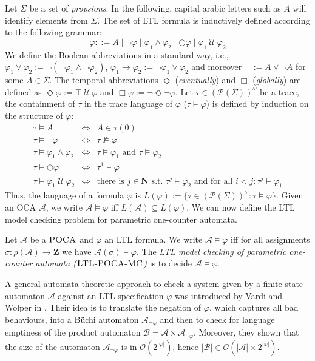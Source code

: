 \documentclass{llncs}
\newcommand{\naturals}{\ensuremath{\mathbf{N}}}
\newcommand{\integers}{\ensuremath{\mathbf{Z}}}
\newcommand{\automaton}{\ensuremath{\mathcal{A}}}
\newcommand{\trace}{\ensuremath{\tau}}
\newcommand{\oca}{\textsc{OCA} }
\newcommand{\poca}{\textsc{POCA} }
\newcommand{\ltlpoca}{\textsc{LTL-POCA-MC} }
\newcommand{\ltl}{\textsc{LTL} }
\newcommand{\until}{\ensuremath{\mathcal{~U~}}}
\newcommand{\propalphabet}{\ensuremath{\Sigma}}
\newcommand{\pastarred}{\ensuremath{(\mathcal{P}(\propalphabet))^{\omega}}}
\newcommand{\defemph}[1]{\emph{#1}}
\begin{document}
Let $\propalphabet$ be a set of \defemph{propsions}. In the following,
capital arabic letters such as $A$ will identify elements from
$\propalphabet$.  The set of \ltl formula is inductively defined
according to the following grammar:
\begin{equation*}
  \varphi ::= A \mid \neg \varphi \mid \varphi_1 \wedge \varphi_2 \mid
  \bigcirc \varphi \mid \varphi_1 \until \varphi_2
\end{equation*}
We define the Boolean abbreviations in a standard way, i.e.,
$\varphi_1 \vee \varphi_2 := \neg (\neg \varphi_1 \wedge \neg
\varphi_2)$, $\varphi_1\rightarrow \varphi_2:=\neg \varphi_1 \vee
\varphi_2$ and moreover $\top:=A\vee \neg A$ for some $A\in
\propalphabet$. The temporal abbreviations $\Diamond$
(\defemph{eventually}) and $\Box$ (\defemph{globally}) are defined as
$\Diamond \varphi:= \top \until \varphi$ and $\Box \varphi := \neg
\Diamond \neg \varphi$.  Let $\trace \in \pastarred$ be a trace, the
containment of $\trace$ in the trace language of $\varphi$ ($\trace
\models \varphi$) is defined by induction on the structure of
$\varphi$:
\begin{eqnarray*}
  \trace \models  A &  \iff & A\in\trace(0)\\
  \trace \models  \neg \varphi &\iff & \trace \not \models \varphi\\
  \trace \models \varphi_1 \wedge \varphi_2 &\iff& \trace
  \models \varphi_1 \text{ and } \trace \models \varphi_2\\
  \trace \models \bigcirc \varphi & \iff & \tau^1 \models \varphi\\
  \trace \models  \varphi_1 \until \varphi_2 & \iff &
  \text{there is } j\in\naturals \text{ s.t. } \tau^j\models \varphi_2
  \text{ and for all } i<j: \tau^j\models \varphi_1
\end{eqnarray*}
Thus, the language of a formula $\varphi$ is $L(\varphi):=\{ \tau \in
\pastarred : \tau\models \varphi\}$.  Given an \oca $\automaton$, we
write $\automaton\models \varphi$ iff $L(\automaton)\subseteq
L(\varphi)$. We can now define the LTL model checking problem for
parametric one-counter automata.
\begin{definition}[$\ltlpoca$]
  Let $\automaton$ be a $\poca$ and $\varphi$ an LTL formula. We write
  $\automaton \models \varphi$ iff for all assignments $\sigma:
  \rho(\automaton)\to \integers$ we have $\automaton(\sigma) \models
  \varphi$.  The \defemph{LTL model checking of parametric one-counter
    automata ($\ltlpoca$)} is to decide $\mathcal{A}\models \varphi$.
\end{definition}
A general automata theoretic approach to check a system given by a
finite state automaton $\automaton$ against an LTL specification
$\varphi$ was introduced by Vardi and Wolper in
\cite{VW86-lics}. Their idea is to translate the negation of
$\varphi$, which captures all bad behaviours, into a B\"uchi automaton
$\automaton_{\neg \varphi}$ and then to check for language emptiness
of the product automaton $\mathcal{B}=\automaton\times
\automaton_{\neg \varphi}$. Moreover, they shown that the size of the
automaton $\automaton_{\neg \varphi}$ is in
$\mathcal{O}(2^{|\varphi|})$, hence $|\mathcal{B}|\in \mathcal{O}
(|\automaton|\times 2^{|\varphi|})$.
\end{document}
